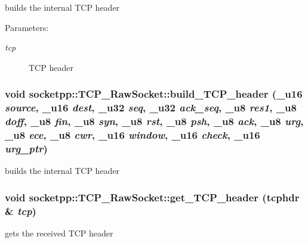 builds the internal TCP header 

\begin{Desc}
\item[Parameters:]
\begin{description}
\item[{\em tcp}]TCP header \end{description}
\end{Desc}
\hypertarget{classsocketpp_1_1TCP__RawSocket_443f8b89224427ae95d22b9b305a4990}{
\subsubsection[{build\_\-TCP\_\-header}]{\setlength{\rightskip}{0pt plus 5cm}void socketpp::TCP\_\-RawSocket::build\_\-TCP\_\-header ({\bf \_\-u16} {\em source}, \/  {\bf \_\-u16} {\em dest}, \/  {\bf \_\-u32} {\em seq}, \/  {\bf \_\-u32} {\em ack\_\-seq}, \/  {\bf \_\-u8} {\em res1}, \/  {\bf \_\-u8} {\em doff}, \/  {\bf \_\-u8} {\em fin}, \/  {\bf \_\-u8} {\em syn}, \/  {\bf \_\-u8} {\em rst}, \/  {\bf \_\-u8} {\em psh}, \/  {\bf \_\-u8} {\em ack}, \/  {\bf \_\-u8} {\em urg}, \/  {\bf \_\-u8} {\em ece}, \/  {\bf \_\-u8} {\em cwr}, \/  {\bf \_\-u16} {\em window}, \/  {\bf \_\-u16} {\em check}, \/  {\bf \_\-u16} {\em urg\_\-ptr})}}
\label{classsocketpp_1_1TCP__RawSocket_443f8b89224427ae95d22b9b305a4990}


builds the internal TCP header 

\hypertarget{classsocketpp_1_1TCP__RawSocket_d7e8b2a67c856e11f0e6cfff5f8b8705}{
\subsubsection[{get\_\-TCP\_\-header}]{\setlength{\rightskip}{0pt plus 5cm}void socketpp::TCP\_\-RawSocket::get\_\-TCP\_\-header (tcphdr \& {\em tcp})}}
\label{classsocketpp_1_1TCP__RawSocket_d7e8b2a67c856e11f0e6cfff5f8b8705}


gets the received TCP header 

